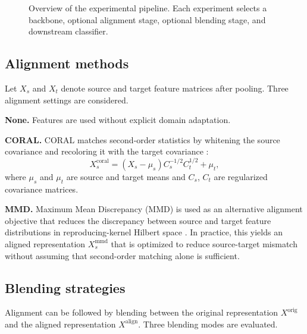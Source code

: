 ﻿\documentclass[10pt,twocolumn,letterpaper]{article}
\begin{document}
\begin{figure}[t]
\centering
{}
\caption{Overview of the experimental pipeline. Each experiment selects a backbone, optional alignment stage, optional blending stage, and downstream classifier.}
\label{fig:pipeline}
\end{figure}

\subsection{Alignment methods}
Let $X_s$ and $X_t$ denote source and target feature matrices after pooling. Three alignment settings are considered.

\textbf{None.} Features are used without explicit domain adaptation.

\textbf{CORAL.} CORAL matches second-order statistics by whitening the source covariance and recoloring it with the target covariance \cite{sun2016deep}:
\begin{equation}
X_s^{\mathrm{coral}} = (X_s - \mu_s) C_s^{-1/2} C_t^{1/2} + \mu_t,
\end{equation}
where $\mu_s$ and $\mu_t$ are source and target means and $C_s$, $C_t$ are regularized covariance matrices.

\textbf{MMD.} Maximum Mean Discrepancy (MMD) is used as an alternative alignment objective that reduces the discrepancy between source and target feature distributions in reproducing-kernel Hilbert space \cite{gretton2012kernel}. In practice, this yields an aligned representation $X_s^{\mathrm{mmd}}$ that is optimized to reduce source-target mismatch without assuming that second-order matching alone is sufficient.

\subsection{Blending strategies}
Alignment can be followed by blending between the original representation $X^{\mathrm{orig}}$ and the aligned representation $X^{\mathrm{align}}$. Three blending modes are evaluated.
\end{document}
